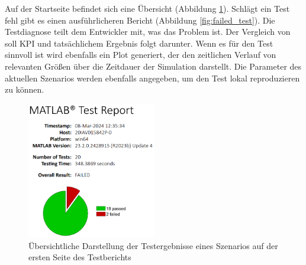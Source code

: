 Auf der Startseite befindet sich eine Übersicht (Abbildung \ref{fig:testreport_aufmacher}). Schlägt ein Test fehl gibt es einen ausführlicheren Bericht (Abbildung \ref{fig:failed_test}). Die Testdiagnose teilt dem Entwickler mit, was das Problem ist. Der Vergleich von soll KPI und tatsächlichem Ergebnis folgt darunter. Wenn es für den Test sinnvoll ist wird ebenfalls ein Plot generiert, der den zeitlichen Verlauf von relevanten Größen über die Zeitdauer der Simulation darstellt. Die Parameter des aktuellen Szenarios werden ebenfalls angegeben, um den Test lokal reproduzieren zu können.
\begin{figure}[ht]
    \centering
    \includegraphics[width=0.5\textwidth]{figures/3_Implementierung/testreport_aufmacher.png}
    \caption[Übersichtliche Darstellung der Testergebnisse eines Szenarios]{Übersichtliche Darstellung der Testergebnisse eines Szenarios auf der ersten Seite des Testberichts}
    \label{fig:testreport_aufmacher}
\end{figure}
